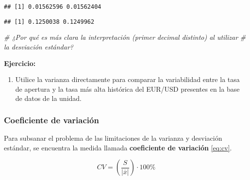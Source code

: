 \documentclass[
]{book}
\newenvironment{Shaded}{\begin{snugshade}}{\end{snugshade}}
\newcommand{\CommentTok}[1]{\textcolor[rgb]{0.56,0.35,0.01}{\textit{#1}}}
\newcommand{\FunctionTok}[1]{\textcolor[rgb]{0.00,0.00,0.00}{#1}}
\newcommand{\NormalTok}[1]{#1}
\newcommand{\SpecialCharTok}[1]{\textcolor[rgb]{0.00,0.00,0.00}{#1}}
\providecommand{\tightlist}{%
  \setlength{\itemsep}{0pt}\setlength{\parskip}{0pt}}
\begin{document}
\begin{verbatim}
## [1] 0.01562596 0.01562404
\end{verbatim}

\begin{Shaded}
\end{Shaded}

\begin{verbatim}
## [1] 0.1250038 0.1249962
\end{verbatim}

\begin{Shaded}
\begin{Highlighting}[]
\CommentTok{\# ¿Por qué es más clara la interpretación (primer decimal distinto) al utilizar}
\CommentTok{\# la desviación estándar?}
\end{Highlighting}
\end{Shaded}

\textbf{Ejercicio:}

\begin{enumerate}
\def\labelenumi{\arabic{enumi}.}
\tightlist
\item
  Utilice la varianza directamente para comparar la variabilidad entre la tasa de apertura y la tasa más alta histórica del EUR/USD presentes en la base de datos de la unidad.
\end{enumerate}

\hypertarget{coeficiente-de-variaciuxf3n}{%
\subsubsection*{Coeficiente de variación}\label{coeficiente-de-variaciuxf3n}}

Para subsanar el problema de las limitaciones de la varianza y desviación estándar, se encuentra la medida llamada \textbf{coeficiente de variación} \eqref{eq:cv}.

\begin{equation}
CV = \left(\frac{S}{|\bar{x}|}\right)\cdot 100\%
\label{eq:cv}
\end{equation}
\end{document}
